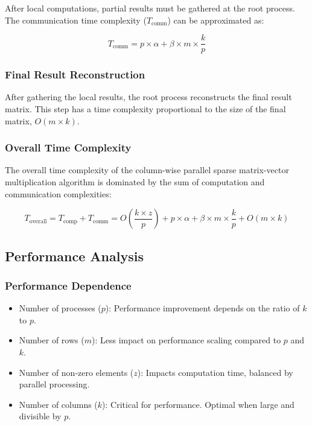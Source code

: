 \documentclass[12pt,oneside]{book} %
\begin{document}
After local computations, partial results must be gathered at the root process.
The communication time complexity (\(T_{\text{comm}}\)) can be approximated as:

\begin{equation}
    T_{\text{comm}} = p \times \alpha + \beta \times m \times \frac{k}{p}
\end{equation}

\subsubsection{Final Result Reconstruction}
After gathering the local results, the root process reconstructs the final
result matrix. This step has a time complexity proportional to the size of the
final matrix, \(O(m \times k)\).

\subsubsection{Overall Time Complexity}

The overall time complexity of the column-wise parallel sparse matrix-vector
multiplication algorithm is dominated by the sum of computation and
communication complexities:

\begin{equation}
    T_{\text{overall}} = T_{\text{comp}} + T_{\text{comm}} = O\left(\frac{k \times z}{p}\right) + p \times \alpha + \beta \times m \times \frac{k}{p} + O(m \times k)
\end{equation}

\subsection{Performance Analysis}
\subsubsection{Performance Dependence}
\begin{itemize}
    \item Number of processes ($p$): Performance improvement depends on the ratio of $k$
          to $p$.
    \item Number of rows ($m$): Less impact on performance scaling compared to $p$ and
          $k$.
    \item Number of non-zero elements ($z$): Impacts computation time, balanced by
          parallel processing.
    \item Number of columns ($k$): Critical for performance. Optimal when large and
          divisible by $p$.
\end{itemize}
\end{document}
